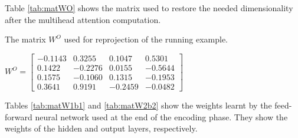\documentclass[algorithms,article,submit,pdftex,moreauthors]{Definitions/mdpi}
\begin{document}
\noindent  Table \ref{tab:matWO} shows the matrix used to restore the needed dimensionality after the multihead attention computation.

\begin{table}[ht]
	\centering
	\caption{The matrix $W^O$ used for reprojection of the running example.}
	\label{tab:matWO}
	$
	W^O =   \begin{bmatrix}
				-0.1143 &  0.3255 &  0.1047 &  0.5301 \\
        0.1422 & -0.2276 &  0.0155 & -0.5644 \\
        0.1575 & -0.1060 &  0.1315 & -0.1953 \\
        0.3641 &  0.9191 & -0.2459 & -0.0482
			\end{bmatrix}
	$
\end{table}

\noindent Tables \ref{tab:matW1b1} and \ref{tab:matW2b2} show the weights learnt by the feed-forward neural network used at the end of the encoding phase. They show the weights of the hidden and output layers, respectively.
\end{document}
